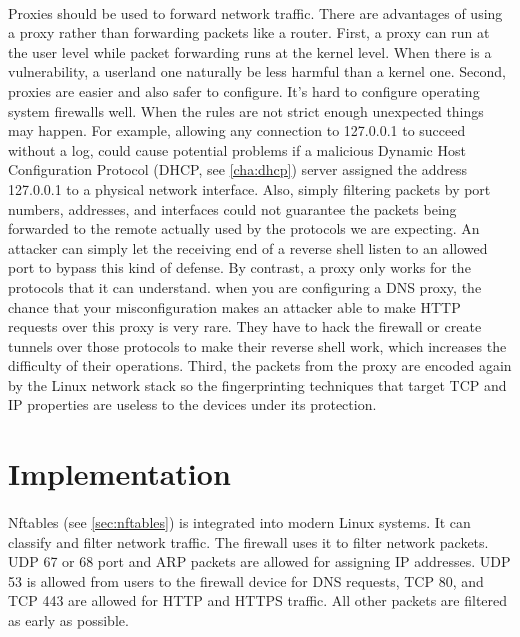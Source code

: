 \documentclass[mscthesis]{usiinfthesis}
\begin{document}
\paragraph{}
Proxies should be used to forward network traffic. There are advantages of using a proxy rather than forwarding packets like a router. First, a proxy can run at the user level while packet forwarding runs at the kernel level. When there is a vulnerability, a userland one naturally be less harmful than a kernel one. Second, proxies are easier and also safer to configure. It's hard to configure operating system firewalls well. When the rules are not strict enough unexpected things may happen. For example, allowing any connection to 127.0.0.1 to succeed without a log, could cause potential problems if a malicious Dynamic Host Configuration Protocol (DHCP, see \cref{cha:dhcp}) server assigned the address 127.0.0.1 to a physical network interface. Also, simply filtering packets by port numbers, addresses, and interfaces could not guarantee the packets being forwarded to the remote actually used by the protocols we are expecting. An attacker can simply let the receiving end of a reverse shell listen to an allowed port to bypass this kind of defense. By contrast, a proxy only works for the protocols that it can understand. when you are configuring a DNS proxy, the chance that your misconfiguration makes an attacker able to make HTTP requests over this proxy is very rare. They have to hack the firewall or create tunnels over those protocols to make their reverse shell work, which increases the difficulty of their operations. Third, the packets from the proxy are encoded again by the Linux network stack so the fingerprinting techniques that target TCP and IP properties are useless to the devices under its protection.

\section{Implementation}
\paragraph{}
Nftables (see \cref{sec:nftables}) is integrated into modern Linux systems. It can classify and filter network traffic. The firewall uses it to filter network packets. UDP 67 or 68 port and ARP packets are allowed for assigning IP addresses. UDP 53 is allowed from users to the firewall device for DNS requests, TCP 80, and TCP 443 are allowed for HTTP and HTTPS traffic. All other packets are filtered as early as possible.
\end{document}
